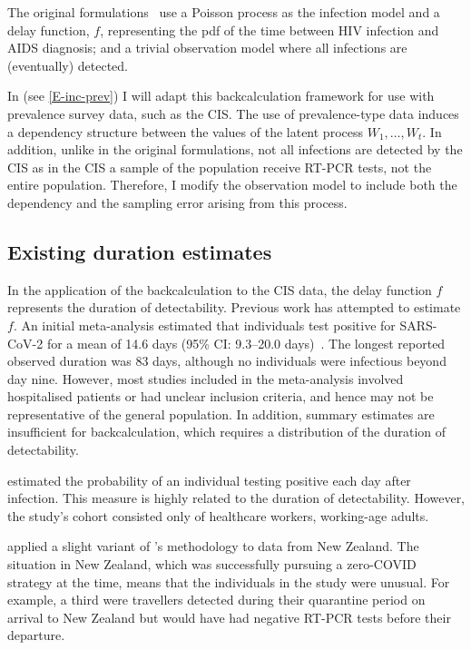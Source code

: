 \documentclass[thesis.tex]{subfiles}
\begin{document}
The original formulations~\autocite{brookmeyerMethod,rosenbergBackcalculation} use a Poisson process as the infection model and a delay function, $f$, representing the pdf of the time between HIV infection and AIDS diagnosis; and a trivial observation model where all infections are (eventually) detected.

In (see \cref{E-inc-prev}) I will adapt this backcalculation framework for use with prevalence survey data, such as the CIS.
The use of prevalence-type data induces a dependency structure between the values of the latent process $W_1, \dots, W_t$. In addition, unlike in the original formulations, not all infections are detected by the CIS as in the CIS a sample of the population receive RT-PCR tests, not the entire population.
Therefore, I modify the observation model to include both the dependency and the sampling error arising from this process.

\subsection{Existing duration estimates} \label{intro:sec:previous-duration-estimates}

In the application of the backcalculation to the CIS data, the delay function $f$ represents the duration of detectability.
Previous work has attempted to estimate $f$.
An initial meta-analysis estimated that individuals test positive for SARS-CoV-2 for a mean of 14.6 days (95\% CI: 9.3--20.0 days)~\autocite{cevikShedding}.
The longest reported observed duration was 83 days, although no individuals were infectious beyond day nine.
However, most studies included in the meta-analysis involved hospitalised patients or had unclear inclusion criteria, and hence may not be representative of the general population.
In addition, summary estimates are insufficient for backcalculation, which requires a distribution of the duration of detectability.

\Textcite{hellewellPCRSensitivity} estimated the probability of an individual testing positive each day after infection.
This measure is highly related to the duration of detectability.
However, the study's cohort consisted only of healthcare workers, \ie working-age adults.

\Textcite{binnySensitivity} applied a slight variant of \textcite{hellewellPCRSensitivity}'s methodology to data from New Zealand.
The situation in New Zealand, which was successfully pursuing a zero-COVID strategy at the time, means that the individuals in the study were unusual.
For example, a third were travellers detected during their quarantine period on arrival to New Zealand but would have had negative RT-PCR tests before their departure.
\end{document}
